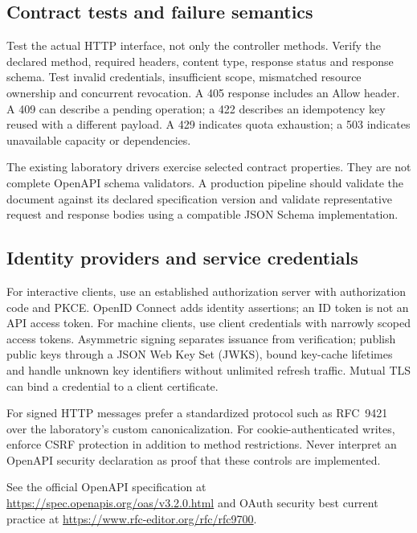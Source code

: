 \subsection{Contract tests and failure semantics}
Test the actual HTTP interface, not only the controller methods. Verify the declared method, required headers, content type, response status and response schema. Test invalid credentials, insufficient scope, mismatched resource ownership and concurrent revocation. A 405 response includes an Allow header. A 409 can describe a pending operation; a 422 describes an idempotency key reused with a different payload. A 429 indicates quota exhaustion; a 503 indicates unavailable capacity or dependencies.

The existing laboratory drivers exercise selected contract properties. They are not complete OpenAPI schema validators. A production pipeline should validate the document against its declared specification version and validate representative request and response bodies using a compatible JSON Schema implementation.

\subsection{Identity providers and service credentials}
For interactive clients, use an established authorization server with authorization code and PKCE. OpenID Connect adds identity assertions; an ID token is not an API access token. For machine clients, use client credentials with narrowly scoped access tokens. Asymmetric signing separates issuance from verification; publish public keys through a JSON Web Key Set (JWKS), bound key-cache lifetimes and handle unknown key identifiers without unlimited refresh traffic. Mutual TLS can bind a credential to a client certificate.

For signed HTTP messages prefer a standardized protocol such as RFC~9421 over the laboratory's custom canonicalization. For cookie-authenticated writes, enforce CSRF protection in addition to method restrictions. Never interpret an OpenAPI security declaration as proof that these controls are implemented.

See the official OpenAPI specification at \url{https://spec.openapis.org/oas/v3.2.0.html} and OAuth security best current practice at \url{https://www.rfc-editor.org/rfc/rfc9700}.
